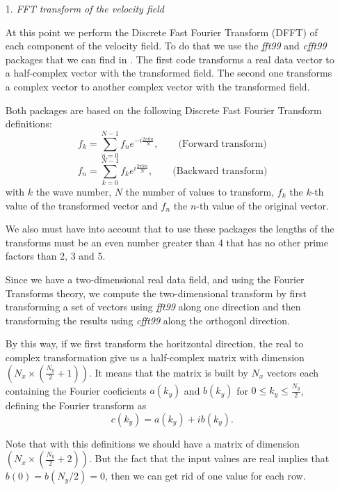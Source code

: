 \begin{itemize}
\item[1.]\textit{FFT transform of the velocity field}

At this point we perform the Discrete Fast Fourier Transform (DFFT) of each component of the velocity field. To do that we use the \textit{fft99} and \textit{cfft99} packages that we can find in \cite{orlandi}. The first code transforms a real data vector to a half-complex vector with the transformed field. The second one transforms a complex vector to another complex vector with the transformed field.

Both packages are based on the following Discrete Fast Fourier Transform definitions:
\begin{equation*}
\label{1.12.1}
f_k=\sum_{n=0}^{N-1}f_ne^{-i\frac{2\pi kn}{N}},\quad\quad\mbox{(Forward transform)}
\end{equation*}
\begin{equation*}
\label{1.12.2}
f_n=\sum_{k=0}^{N-1}f_ke^{i\frac{2\pi kn}{N}},\quad\quad\mbox{(Backward transform)}
\end{equation*}
with $k$ the wave number, $N$ the number of values to transform, $f_k$ the $k$-th value of the transformed vector and $f_n$ the $n$-th value of the original vector.

We also must have into account that to use these packages the lengths of the transforms must be an even number greater than 4 that has no other prime factors than 2, 3 and 5.

Since we have a two-dimensional real data field, and using the Fourier Transforms theory, we compute the two-dimensional transform by first transforming a set of vectors using \textit{fft99} along one direction and then transforming the results using \textit{cfft99} along the orthogonl direction.

By this way, if we first transform the horitzontal direction, the real to complex transformation give us a half-complex matrix with dimension $\left(N_x\times\left(\frac{N_y}{2}+1\right)\right)$. It means that the matrix is built by $N_x$ vectors each containing the Fourier coeficients $a(k_y)$ and $b(k_y)$ for $0\leq k_y\leq \frac{N_y}{2}$, defining the Fourier transform as
$$c(k_y)=a(k_y)+ib(k_y).$$

Note that with this definitions we should have a matrix of dimension $\left(N_x\times\left(\frac{N_y}{2}+2\right)\right)$. But the fact that the input values are real implies that $b(0)=b(N_y/2)=0$, then we can get rid of one value for each row.


\end{itemize}
